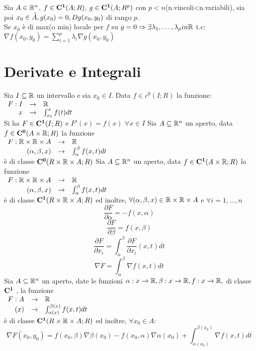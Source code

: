 Sia $A\in \mathbb{R}^n$, $f\in \mathbf{C^{1}}(A;R)$, $g\in \mathbf{C^{1}}(A;R^p)$ con $p<n$(n.vincoli<n.variabili), sia poi $x_0\in\accentset{\circ}{A}, g(x_0)=0, Dg (x_0,y_0)$ di rango $p$.\\
Se $x_0$ è di max(o min) locale per $f$ su $g=0\Rightarrow\exists \lambda_1,\ldots,\lambda_p in \mathbb{R}$ t.c: $\nabla f(x_0,y_0) = \sum\limits_{i=1}^{p}\lambda_i\nabla g(x_0,y_0)$\\
\section{Derivate e Integrali}
Sia $I\subseteq \mathbb{R}$ un intervallo e sia $x_0\in I$. Data $f\in c^0(I;R)$ la funzione:\\
$\begin{array}{rcl} F: I & \to & \mathbb{R} \\ x & \to & \int_{x_0}^{x}f(t)dt \end{array}$\\
Si ha $F\in \mathbf{C^{1}}(I;R)$ e $F'(x)=f(x)$ $\forall x \in I$
\proposition
Sia $A\subseteq \mathbb{R}^n$ un aperto, data $f\in \mathbf{C^{0}}(A\times \mathbb{R};R)$ la funzione \\
$\begin{array}{rcl} F: \mathbb{R}\times \mathbb{R}\times A & \to & \mathbb{R} \\ (\alpha,\beta,x) & \to & \int_{\alpha}^{\beta}f(x,t)dt \end{array}$\\
è di classe $\mathbf{C^{0}}(R\times \mathbb{R}\times A;R)$
\proposition
Sia $A\subseteq \mathbb{R}^n$ un aperto, data $f\in \mathbf{C^{1}}(A\times \mathbb{R};R)$ la funzione \\
$\begin{array}{rcl} F: \mathbb{R}\times \mathbb{R}\times A & \to & \mathbb{R} \\ (\alpha,\beta,x) & \to & \int_{\alpha}^{\beta}f(x,t)dt \end{array}$\\
è di classe $\mathbf{C^{1}}(R\times \mathbb{R}\times A;R)$ ed inoltre, $\forall (\alpha,\beta,x)\in \mathbb{R}\times \mathbb{R}\times A$ e $\forall i=1,\ldots,n$\\
$$\frac{\partial F}{\partial \alpha}=-f(x,\alpha)$$
$$\frac{\partial F}{\partial \beta}=f(x,\beta)$$
$$\frac{\partial F}{\partial x_i}=\int_{\alpha}^{\beta}\frac{\partial F}{\partial x_i}(x,t)dt$$
$$\nabla F=\int_{\alpha}^{\beta}\nabla f(x,t)dt$$
\corollary
Sia $A\subseteq \mathbb{R}^n$ un aperto, date le funzioni $\alpha:x\rightarrow \mathbb{R}, \beta:x\rightarrow \mathbb{R}, f:x\rightarrow \mathbb{R}, $ di classe $\mathbf{C^{1}}$ , la funzione \\
$\begin{array}{rcl} F: A & \to & \mathbb{R} \\ (x) & \to & \int_{\alpha(x)}^{\beta(x)}f(x,t)dt \end{array}$\\
è di classe $\mathbf{C^{1}}(R\times \mathbb{R}\times A;R)$ ed inoltre, $\forall x_0 \in A$:
$$\nabla F(x_0,y_0)=f(x_0,\beta)\nabla\beta(x_0)-f(x_0,\alpha)\nabla\alpha(x_0)+\int_{\alpha(x_0)}^{\beta(x_0)}\nabla f(x,t)dt$$


